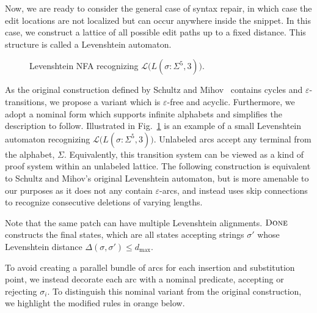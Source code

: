 \documentclass[sigplan,review,acmsmall,nonacm,screen,anonymous]{acmart}\settopmatter{printfolios=false,printccs=false,printacmref=false}
\begin{document}
Now, we are ready to consider the general case of syntax repair, in which case the edit locations are not localized but can occur anywhere inside the snippet. In this case, we construct a lattice of all possible edit paths up to a fixed distance. This structure is called a Levenshtein automaton.

\begin{figure}
  \vspace{-0.3cm}
  \begin{center}
    
  \end{center}
  \caption{Levenshtein NFA recognizing $\mathcal{L}\big(L(\sigma: \Sigma^5, 3)\big)$.}\label{fig:lev_nfa}
  \vspace{-0.5cm}
\end{figure}

As the original construction defined by Schultz and Mihov~\cite{schulz2002fast} contains cycles and $\varepsilon$-transitions, we propose a variant which is $\varepsilon$-free and acyclic. Furthermore, we adopt a nominal form which supports infinite alphabets and simplifies the description to follow. Illustrated in Fig.~\ref{fig:lev_nfa} is an example of a small Levenshtein automaton recognizing $\mathcal{L}\big(L(\sigma: \Sigma^5, 3)\big)$. Unlabeled arcs accept any terminal from the alphabet, $\Sigma$. Equivalently, this transition system can be viewed as a kind of proof system within an unlabeled lattice. The following construction is equivalent to Schultz and Mihov's original Levenshtein automaton, but is more amenable to our purposes as it does not any contain $\varepsilon$-arcs, and instead uses skip connections to recognize consecutive deletions of varying lengths.



Note that the same patch can have multiple Levenshtein alignments. $\textsc{Done}$ constructs the final states, which are all states accepting strings $\sigma'$ whose Levenshtein distance $\Delta(\sigma, \sigma') \leq d_\max$.

To avoid creating a parallel bundle of arcs for each insertion and substitution point, we instead decorate each arc with a nominal predicate, accepting or rejecting $\sigma_i$. To distinguish this nominal variant from the original construction, we highlight the modified rules in orange below.
\end{document}
